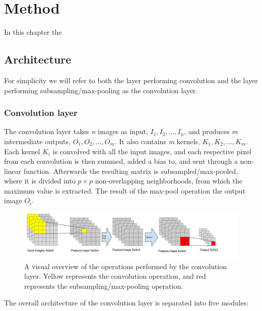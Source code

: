 \chapter{Method}

In this chapter the 
\section{Architecture}


For simplicity we will refer to both the layer performing convolution and the layer performing subsampling/max-pooling as the convolution layer. 

\subsection {Convolution layer}

The convolution layer takes \textit{n} images as input, $ I_1, I_2, \dots, I_n $, and produces \textit{m} intermediate outputs, $O_1, O_2, \dots, O_m $. It also contains \textit{m} kernels, $ K_1, K_2, \dots, K_m $. Each kernel $ K_i $ is convolved with all the input images, and each respective pixel from each convolution is then summed, added a bias to, and sent through a non-linear function. Afterwards the resulting matrix is subsampled/max-pooled, where it is divided into $ p \times p $ non-overlapping neighborhoods, from which the maximum value is extracted. The result of the max-pool operation the output image $ O_i $. 
 


\begin{figure}[h!]
  \centering
      \includegraphics[width=1.0\textwidth]{Figures/Method/Convolution_subsample_pool}
  \caption{A visual overview of the operations performed by the convolution layer. Yellow represents the convolution operation, and red represents the subsampling/max-pooling operation.}
\end{figure}



The overall architecture of the convolution layer is separated into five modules:

